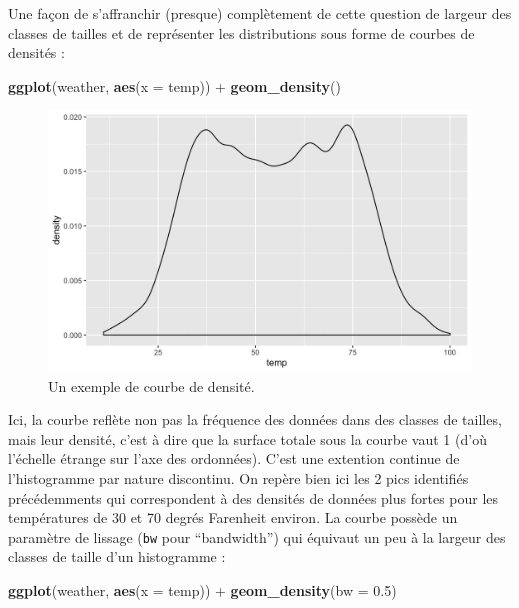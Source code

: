 \documentclass[a4paperpaper,]{article}
\newenvironment{Shaded}{\begin{snugshade}}{\end{snugshade}}
\newcommand{\DataTypeTok}[1]{\textcolor[rgb]{0.00,0.34,0.68}{#1}}
\newcommand{\FloatTok}[1]{\textcolor[rgb]{0.69,0.50,0.00}{#1}}
\newcommand{\KeywordTok}[1]{\textcolor[rgb]{0.12,0.11,0.11}{\textbf{#1}}}
\newcommand{\NormalTok}[1]{\textcolor[rgb]{0.12,0.11,0.11}{#1}}
\newcommand{\OperatorTok}[1]{\textcolor[rgb]{0.12,0.11,0.11}{#1}}
\newcommand{\StringTok}[1]{\textcolor[rgb]{0.75,0.01,0.01}{#1}}
\begin{document}
Une façon de s'affranchir (presque) complètement de cette question de largeur des classes de tailles et de représenter les distributions sous forme de courbes de densités :

\begin{Shaded}
\begin{Highlighting}[]
\KeywordTok{ggplot}\NormalTok{(weather, }\KeywordTok{aes}\NormalTok{(}\DataTypeTok{x =}\NormalTok{ temp)) }\OperatorTok{+}
\StringTok{  }\KeywordTok{geom_density}\NormalTok{()}
\end{Highlighting}
\end{Shaded}

\begin{figure}[htpb]

{\centering \includegraphics[width=0.9\linewidth]{figure/density-1} 

}

\caption{Un exemple de courbe de densité.}\label{fig:density}
\end{figure}

Ici, la courbe reflète non pas la fréquence des données dans des classes de tailles, mais leur densité, c'est à dire que la surface totale sous la courbe vaut 1 (d'où l'échelle étrange sur l'axe des ordonnées). C'est une extention continue de l'histogramme par nature discontinu. On repère bien ici les 2 pics identifiés précédemments qui correspondent à des densités de données plus fortes pour les températures de 30 et 70 degrés Farenheit environ.
La courbe possède un paramètre de lissage (\texttt{bw} pour ``bandwidth'') qui équivaut un peu à la largeur des classes de taille d'un histogramme :

\begin{Shaded}
\begin{Highlighting}[]
\KeywordTok{ggplot}\NormalTok{(weather, }\KeywordTok{aes}\NormalTok{(}\DataTypeTok{x =}\NormalTok{ temp)) }\OperatorTok{+}
\StringTok{  }\KeywordTok{geom_density}\NormalTok{(}\DataTypeTok{bw =} \FloatTok{0.5}\NormalTok{)}
\end{Highlighting}
\end{Shaded}
\end{document}
